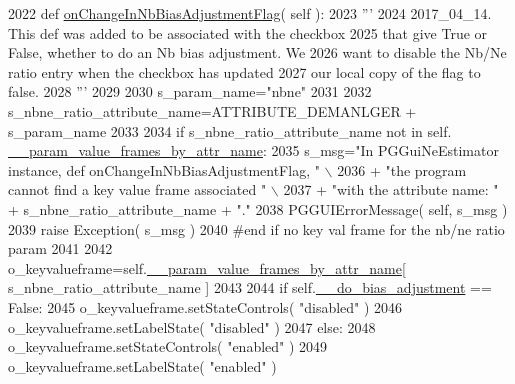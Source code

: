 \begin{DoxyCode}
2022     \textcolor{keyword}{def }\hyperlink{classnegui_1_1pgguineestimator_1_1PGGuiNeEstimator_afe51feb1cba7881b61daa2413a329ef8}{onChangeInNbBiasAdjustmentFlag}( self ):
2023         \textcolor{stringliteral}{'''}
2024 \textcolor{stringliteral}{        2017\_04\_14.  This def was added to be associated with the checkbox}
2025 \textcolor{stringliteral}{        that give True or False, whether to do an Nb bias adjustment.  We }
2026 \textcolor{stringliteral}{        want to disable the Nb/Ne ratio entry when the checkbox has updated}
2027 \textcolor{stringliteral}{        our local copy of the flag to false.}
2028 \textcolor{stringliteral}{        '''}
2029         
2030         s\_param\_name=\textcolor{stringliteral}{"nbne"}
2031 
2032         s\_nbne\_ratio\_attribute\_name=ATTRIBUTE\_DEMANLGER + s\_param\_name
2033 
2034         \textcolor{keywordflow}{if} s\_nbne\_ratio\_attribute\_name \textcolor{keywordflow}{not} \textcolor{keywordflow}{in} self.
      \hyperlink{classnegui_1_1pgguineestimator_1_1PGGuiNeEstimator_a01c0c94da8e029c574ae365c12df4a2e}{\_\_param\_value\_frames\_by\_attr\_name}:
2035             s\_msg=\textcolor{stringliteral}{"In PGGuiNeEstimator instance, def onChangeInNbBiasAdjustmentFlag, "} \(\backslash\)
2036                         + \textcolor{stringliteral}{"the program cannot find a key value frame associated "} \(\backslash\)
2037                         + \textcolor{stringliteral}{"with the attribute name: "} + s\_nbne\_ratio\_attribute\_name + \textcolor{stringliteral}{"."}
2038             PGGUIErrorMessage( self, s\_msg )
2039             \textcolor{keywordflow}{raise} Exception( s\_msg )
2040         \textcolor{comment}{#end if no key val frame for the nb/ne ratio param}
2041 
2042         o\_keyvalueframe=self.\hyperlink{classnegui_1_1pgguineestimator_1_1PGGuiNeEstimator_a01c0c94da8e029c574ae365c12df4a2e}{\_\_param\_value\_frames\_by\_attr\_name}[ 
      s\_nbne\_ratio\_attribute\_name ]
2043 
2044         \textcolor{keywordflow}{if} self.\hyperlink{classnegui_1_1pgguineestimator_1_1PGGuiNeEstimator_a1e135d18d8ed94d7ee0e36529c0cfec2}{\_\_do\_bias\_adjustment} == \textcolor{keyword}{False}:
2045             o\_keyvalueframe.setStateControls( \textcolor{stringliteral}{"disabled"} )
2046             o\_keyvalueframe.setLabelState( \textcolor{stringliteral}{"disabled"} )
2047         \textcolor{keywordflow}{else}:
2048             o\_keyvalueframe.setStateControls( \textcolor{stringliteral}{"enabled"} )
2049             o\_keyvalueframe.setLabelState( \textcolor{stringliteral}{"enabled"} )

\end{DoxyCode}
